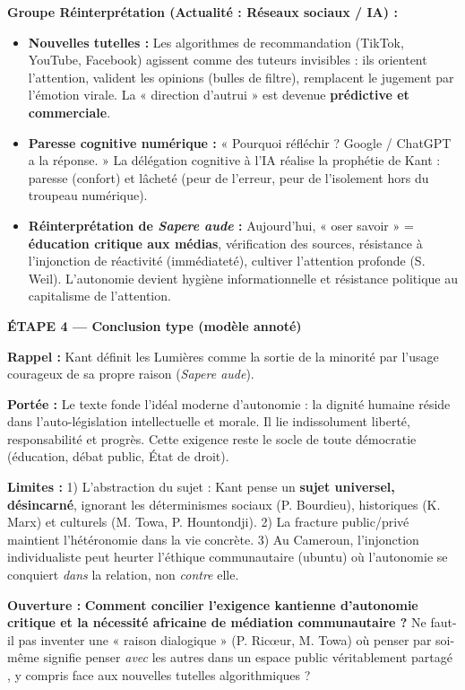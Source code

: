 \documentclass[11pt]{article}
\newcommand{\cle}[1]{{\popxbold\color{popdark}#1}}
\begin{document}
\begin{exoresolu}
\textbf{Groupe Réinterprétation (Actualité : Réseaux sociaux / IA) :}
\begin{itemize}
    \item \textbf{Nouvelles tutelles :} Les algorithmes de recommandation (TikTok, YouTube, Facebook) agissent comme des \cle{tuteurs invisibles} : ils orientent l'attention, valident les opinions (bulles de filtre), remplacent le jugement par l'émotion virale. La « direction d'autrui » est devenue \textbf{prédictive et commerciale}.
    \item \textbf{Paresse cognitive numérique :} « Pourquoi réfléchir ? Google / ChatGPT a la réponse. » La \cle{délégation cognitive} à l'IA réalise la prophétie de Kant : paresse (\cle{confort}) et lâcheté (\cle{peur de l'erreur}, \cle{peur de l'isolement} hors du troupeau numérique).
    \item \textbf{Réinterprétation de \emph{Sapere aude} :} Aujourd'hui, « oser savoir » = \textbf{éducation critique aux médias}, \cle{vérification des sources}, \cle{résistance à l'injonction de réactivité} (immédiateté), \cle{cultiver l'attention profonde} (S. Weil). L'autonomie devient \cle{hygiène informationnelle} et \cle{résistance politique} au capitalisme de l'attention.
\end{itemize}

\vspace{0.5cm}
\textbf{ÉTAPE 4 — Conclusion type (modèle annoté)}

\guillemotleft \textbf{Rappel :} Kant définit les Lumières comme la sortie de la minorité par l'usage courageux de sa propre raison (\emph{Sapere aude}).

\textbf{Portée :} Le texte fonde l'\cle{idéal moderne d'autonomie} : la dignité humaine réside dans l'auto-législation intellectuelle et morale. Il lie indissolument \cle{liberté}, \cle{responsabilité} et \cle{progrès}. Cette exigence reste le socle de toute démocratie (éducation, débat public, État de droit).

\textbf{Limites :} 1) L'abstraction du sujet : Kant pense un \textbf{sujet universel, désincarné}, ignorant les déterminismes sociaux (P. Bourdieu), historiques (K. Marx) et culturels (M. Towa, P. Hountondji). 2) La fracture public/privé maintient l'hétéronomie dans la vie concrète. 3) Au Cameroun, l'injonction individualiste peut heurter l'éthique communautaire (\cle{ubuntu}) où l'autonomie se conquiert \emph{dans} la relation, non \emph{contre} elle.

\textbf{Ouverture :} \textbf{Comment concilier l'exigence kantienne d'autonomie critique et la nécessité africaine de médiation communautaire ?} Ne faut-il pas inventer une \cle{« raison dialogique »} (P. Ricœur, M. Towa) où \guillemotleft penser par soi-même \guillemotright signifie \guillemotleft penser \emph{avec} les autres dans un espace public véritablement partagé \guillemotright, y compris face aux nouvelles tutelles algorithmiques ? \guillemotright


\end{exoresolu}
\end{document}
